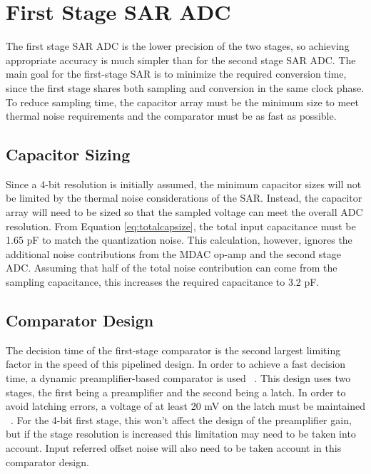 \chapter{First Stage SAR ADC}
The first stage SAR ADC is the lower precision of the two stages, so achieving appropriate accuracy is much simpler than for the second stage SAR ADC. The main goal for the first-stage SAR is to minimize the required conversion time, since the first stage shares both sampling and conversion in the same clock phase. To reduce sampling time, the capacitor array must be the minimum size to meet thermal noise requirements and the comparator must be as fast as possible.
\section{Capacitor Sizing}
Since a 4-bit resolution is initially assumed, the minimum capacitor sizes will not be limited by the thermal noise considerations of the SAR. Instead, the capacitor array will need to be sized so that the sampled voltage can meet the overall ADC resolution. From Equation \ref{eq:totalcapsize}, the total input capacitance must be 1.65 pF to match the quantization noise. This calculation, however, ignores the additional noise contributions from the MDAC op-amp and the second stage ADC. Assuming that half of the total noise contribution can come from the sampling capacitance, this increases the required capacitance to 3.2 pF. 
\section{Comparator Design}
The decision time of the first-stage comparator is the second largest limiting factor in the speed of this pipelined design. In order to achieve a fast decision time, a dynamic preamplifier-based comparator is used ~\cite{5714725}. This design uses two stages, the first being a preamplifier and the second being a latch. In order to avoid latching errors, a voltage of at least 20 mV on the latch must be maintained ~\cite{4541339}. For the 4-bit first stage, this won't affect the design of the preamplifier gain, but if the stage resolution is increased this limitation may need to be taken into account. Input referred offset noise will also need to be taken account in this comparator design. 